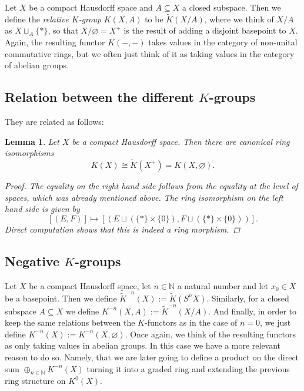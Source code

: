 \documentclass[12pt,a4paper]{amsart}
\theoremstyle{plain}
\newtheorem{lm}[thm]{Lemma}
\theoremstyle{definition}
\theoremstyle{remark}
\begin{document}
Let $X$ be a compact Hausdorff space and $A \subseteq X$ a closed subspace.
Then we define the \textit{relative $K$-group} $K(X,A)$ to be $\tilde{K}(X/A)$, where we think of $X/A$ as $X \sqcup_{A} \{ * \}$, so that $X/\varnothing = X^{+}$ is the result of adding a disjoint basepoint to $X$.
Again, the resulting functor $K(-,-)$ takes values in the category of non-unital commutative rings, but we often just think of it as taking values in the category of abelian groups.

\subsection{Relation between the different $K$-groups}

They are related as follows:

\begin{lm}
  Let $X$ be a compact Hausdorff space.
  Then there are canonical ring isomorphisms
  \[ K(X) \cong \tilde{K}(X^{+}) = K(X,\varnothing). \]
  \begin{proof}
    The equality on the right hand side follows from the equality at the level of spaces, which was already mentioned above.
    The ring isomorphism on the left hand side is given by
    \[ [(E,F)] \mapsto [(E \sqcup (\{ * \} \times \{ 0 \}), F \sqcup (\{ * \} \times \{ 0 \}))]. \]
    Direct computation shows that this is indeed a ring morphism.
  \end{proof}
\end{lm}

\subsection{Negative $K$-groups}

Let $X$ be a compact Hausdorff space, let $n \in \mathbb{N}$ a natural number and let $x_{0} \in X$ be a basepoint.
Then we define $\tilde{K}^{-n}(X) := \tilde{K}(S^{n}X)$.
Similarly, for a closed subspace $A \subseteq X$ we define $K^{-n}(X,A) := \tilde{K}^{-n}(X/A)$.
And finally, in order to keep the same relations between the $K$-functors as in the case of $n = 0$, we just define $K^{-n}(X) := K^{-n}(X,\varnothing)$.
Once again, we think of the resulting functors as only taking values in abelian groups.
In this case we have a more relevant reason to do so.
Namely, that we are later going to define a product on the direct sum $\oplus_{n \in \mathbb{N}} K^{-n}(X)$ turning it into a graded ring and extending the previous ring structure on $K^{0}(X)$.
\end{document}
